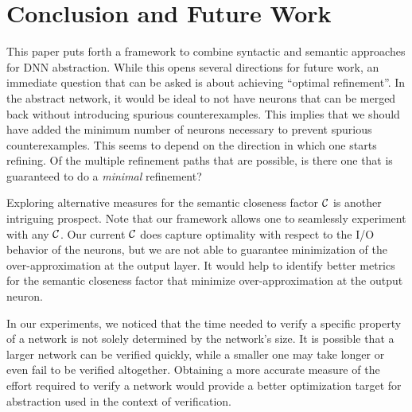 \section{Conclusion and Future Work}

This paper puts forth a framework to combine syntactic and semantic approaches
for DNN abstraction. While this opens several directions for future work, an
immediate question that can be asked is about achieving ``optimal refinement''.
In the abstract network, it would be ideal to not have neurons that can be
merged back without introducing spurious counterexamples. This implies that we
should have added the minimum number of neurons necessary to prevent spurious
counterexamples. This seems to depend on the direction in which one starts
refining. Of the multiple refinement paths that are possible, is there one that
is guaranteed to do a \emph{minimal} refinement?

Exploring alternative measures for the semantic closeness factor $\mathcal{C}$ is
another intriguing prospect. Note that our framework allows one to seamlessly
experiment with any $\mathcal{C}$. Our current $\mathcal{C}$ does capture optimality with
respect to the I/O behavior of the neurons, but we are not able to guarantee
minimization of the over-approximation at the output layer. It would help to
identify better metrics for the semantic closeness factor that minimize
over-approximation at the output neuron. 

In our experiments, we noticed that the time needed to verify a specific
property of a network is not solely determined by the network's size. It is
possible that a larger network can be verified quickly, while a smaller one may
take longer or even fail to be verified altogether. Obtaining a more accurate
measure of the effort required to verify a network would provide a better
optimization target for abstraction used in the context of verification.



